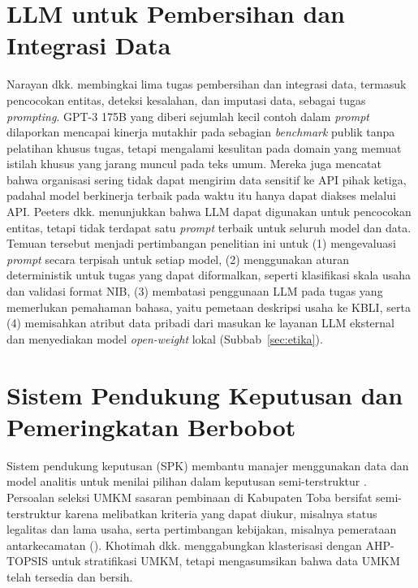 \section{LLM untuk Pembersihan dan Integrasi Data}
\label{sec:wrangling}

Narayan dkk. \cite{narayan2022wrangle} membingkai lima tugas pembersihan dan integrasi data, termasuk pencocokan entitas, deteksi kesalahan, dan imputasi data, sebagai tugas \textit{prompting}. GPT-3 175B yang diberi sejumlah kecil contoh dalam \textit{prompt} dilaporkan mencapai kinerja mutakhir pada sebagian \textit{benchmark} publik tanpa pelatihan khusus tugas, tetapi mengalami kesulitan pada domain yang memuat istilah khusus yang jarang muncul pada teks umum. Mereka juga mencatat bahwa organisasi sering tidak dapat mengirim data sensitif ke API pihak ketiga, padahal model berkinerja terbaik pada waktu itu hanya dapat diakses melalui API. Peeters dkk. \cite{peeters2025entity} menunjukkan bahwa LLM dapat digunakan untuk pencocokan entitas, tetapi tidak terdapat satu \textit{prompt} terbaik untuk seluruh model dan data. Temuan tersebut menjadi pertimbangan penelitian ini untuk (1) mengevaluasi \textit{prompt} secara terpisah untuk setiap model, (2) menggunakan aturan deterministik untuk tugas yang dapat diformalkan, seperti klasifikasi skala usaha dan validasi format NIB, (3) membatasi penggunaan LLM pada tugas yang memerlukan pemahaman bahasa, yaitu pemetaan deskripsi usaha ke KBLI, serta (4) memisahkan atribut data pribadi dari masukan ke layanan LLM eksternal dan menyediakan model \textit{open-weight} lokal (Subbab~\ref{sec:etika}).

\section{Sistem Pendukung Keputusan dan Pemeringkatan Berbobot}
\label{sec:spk}

Sistem pendukung keputusan (SPK) membantu manajer menggunakan data dan model analitis untuk menilai pilihan dalam keputusan semi-terstruktur \cite[hlm.~412]{laudon2026mis}. Persoalan seleksi UMKM sasaran pembinaan di Kabupaten Toba bersifat semi-terstruktur karena melibatkan kriteria yang dapat diukur, misalnya status legalitas dan lama usaha, serta pertimbangan kebijakan, misalnya pemerataan antarkecamatan (\lampkadis). Khotimah dkk. \cite{khotimah2024hybrid} menggabungkan klasterisasi dengan AHP-TOPSIS untuk stratifikasi UMKM, tetapi mengasumsikan bahwa data UMKM telah tersedia dan bersih.

